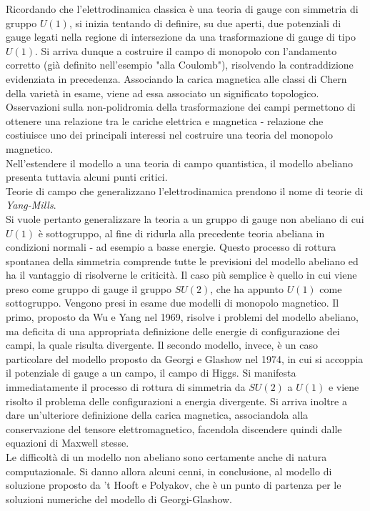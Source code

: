 Ricordando che l'elettrodinamica classica è una teoria di gauge con simmetria
di gruppo $U(1)$, si inizia tentando di definire, su due aperti, due potenziali di
gauge legati nella regione di intersezione da una trasformazione di
gauge di tipo $U(1)$. Si arriva dunque a costruire il campo di monopolo
con l'andamento corretto (già definito nell'esempio "alla Coulomb"), risolvendo
la contraddizione evidenziata in precedenza.
Associando la carica magnetica alle classi di Chern della varietà in esame, viene
ad essa associato un significato topologico. \\
Osservazioni sulla non-polidromia della trasformazione dei campi permettono di
ottenere una relazione tra le cariche elettrica e magnetica - relazione che costiuisce
uno dei principali interessi nel costruire una teoria del monopolo magnetico.\\
Nell'estendere il modello a una teoria di campo quantistica,
il modello abeliano presenta tuttavia alcuni punti critici.\\

Teorie di campo che generalizzano l'elettrodinamica prendono il nome di
teorie di \emph{Yang-Mills}.\\
Si vuole pertanto generalizzare la teoria a un gruppo di gauge non abeliano di cui
$U(1)$ è sottogruppo, al fine di ridurla alla precedente teoria abeliana in
condizioni normali - ad esempio a basse energie.
Questo processo di rottura spontanea della simmetria comprende tutte le previsioni
del modello abeliano ed ha il vantaggio di risolverne le criticità.
Il caso più semplice è quello in cui viene preso come gruppo di gauge il gruppo
$SU(2)$, che ha appunto $U(1)$ come sottogruppo.
Vengono presi in esame due modelli di monopolo magnetico.
Il primo, proposto da Wu e Yang nel 1969, risolve i problemi del modello abeliano,
ma deficita di una appropriata definizione delle energie di configurazione dei campi,
la quale risulta divergente.
Il secondo modello, invece, è un caso
particolare del modello proposto da Georgi e Glashow nel 1974, in cui
si accoppia il potenziale di gauge a un campo, il campo di Higgs. Si manifesta
immediatamente il processo di rottura di simmetria da $SU(2)$ a $U(1)$ e viene
risolto il problema delle configurazioni a energia divergente. Si arriva inoltre
a dare un'ulteriore definizione della carica magnetica, associandola alla
conservazione del tensore elettromagnetico, facendola discendere quindi dalle equazioni di
Maxwell stesse.\\

Le difficoltà di un modello non abeliano sono certamente anche di natura
computazionale. Si danno allora alcuni cenni, in conclusione, al modello di
soluzione proposto da 't Hooft e Polyakov, che è un punto di partenza per le
soluzioni numeriche del modello di Georgi-Glashow.
